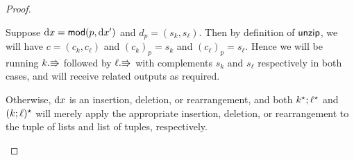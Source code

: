 \begin{proof}
\begin{itemize}
            Suppose $\textrm{d} x=\mathsf{mod}(p,\textrm{d} x')$ and $d_p = (s_k,s_\ell)$. Then by
            definition of $\mathsf{unzip}$, we will have $c=(c_k,c_\ell)$ and
            $(c_k)_p=s_k$ and $(c_\ell)_p=s_\ell$. Hence we will be running
            $k.\mathord{\Rrightarrow}$ followed by $\ell.\mathord{\Rrightarrow}$ with complements $s_k$ and
            $s_\ell$ respectively in both cases, and will receive related
            outputs as required.

            Otherwise, $\textrm{d} x$ is an insertion, deletion, or rearrangement,
            and both $k^\star;\ell^\star$ and $(k;\ell)^\star$ will merely apply the
            appropriate insertion, deletion, or rearrangement to the tuple
            of lists and list of tuples, respectively.
    \end{itemize}
\end{proof}
\fi

